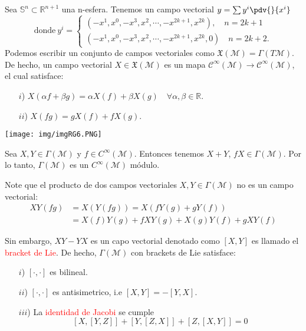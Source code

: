 \documentclass[../main]{subfiles}
\begin{document}
\begin{adjustwidth}{0pt}{-100pt}
\ejemplo{} Sea $\mathbb{S}^n \subset \mathbb{R}^{n+1}$ una n-esfera. Tenemos un campo vectorial $y=\sum y^{i}\pdv{}{x^{i}}$
\begin{equation}
    \text{donde} \ y^{i}=
    \left\{
    \begin{matrix}
        (-x^1, x^0, -x^3, x^2, \cdots, -x^{2k+1}, x^{2k}), \quad n=2k+1\\
        (-x^1, x^0, -x^3, x^2, \cdots, -x^{2k+1}, x^{2k}, 0) \quad n=2k+2.
    \end{matrix}
    \right.
\end{equation}
Podemos escribir un conjunto de campos vectoriales como $\mathfrak{X}(\mathcal{M})=\Gamma (T\mathcal{M})$. De hecho, un campo vectorial $X \in \mathfrak{X}(\mathcal{M})$ es un mapa $\mathcal{C}^{\infty}(\mathcal{M})\rightarrow \mathcal{C}^{\infty}(\mathcal{M})$, el cual satisface:
\begin{enumerate}
    \item[$i$)] $X(\alpha f+\beta g)=\alpha X(f)+\beta X(g)\quad \forall \alpha, \beta \in \mathbb{R}$.\\
    \item[$ii$)] $X(fg)=gX(f)+fX(g)$.  
\end{enumerate}


\begin{center}
\texttt{[image: img/imgRG6.PNG]}
\end{center}

Sea $X, Y \in \Gamma(\mathcal{M})$ y $f\in C^{\infty}(\mathcal{M})$. Entonces tenemos $X+Y$, $fX \in \Gamma(\mathcal{M})$. Por lo tanto, $\Gamma(\mathcal{M})$ es un $C^{\infty}(\mathcal{M})$ módulo.

Note que el producto de dos campos vectoriales $X, Y \in \Gamma(\mathcal{M})$ no es un campo vectorial:
\begin{equation}
    \begin{split}
        XY(fg)&=X\left(Y(fg)\right)=X\left(fY(g)+gY(f)\right)\\
        &=X(f)Y(g)+fXY(g)+X(g)Y(f)+gXY(f)
    \end{split}
\end{equation}

Sin embargo, $XY-YX$ es un capo vectorial denotado como $[X, Y]$ es llamado el \textcolor{red}{bracket de Lie}. De hecho, $\Gamma(\mathcal{M})$ con brackets de Lie satisface:
\begin{enumerate}
    \item[$i$)]  $[\cdot, \cdot]$ es bilineal.
    \item[$ii$)] $[\cdot, \cdot]$ es antisimetrico, i.e $[X, Y]=-[Y, X]$.
    \item[$iii$)] La \textcolor{red}{identidad de Jacobi} se cumple 
    \begin{equation*}
        \left[X, [Y, Z]\right]+\left[Y, [Z, X]\right]+\left[Z, [X, Y]\right]=0
    \end{equation*}
\end{enumerate}


\end{adjustwidth}
\end{document}
